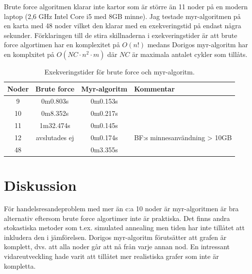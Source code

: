 \documentclass[11pt]{article}
\begin{document}
Brute force algoritmen klarar inte kartor som är större än 11 noder på en modern laptop (2,6 GHz Intel Core i5 med 8GB minne). Jag testade myr-algoritmen på en karta med 48 noder vilket den klarar med en exekveringstid på endast några sekunder. Förklaringen till de stira skillnaderna i exekveringstider är att brute force algortimen har en komplexitet på $O(n!)$ medans Dorigos myr-algoritm har en komplxitet på $O(NC \cdot n^2 \cdot m)$ där $NC$ är maximala antalet cykler som tillåts.

\begin{table}[h]
	\begin{center}
		\begin{tabular}{|c|c|c|l|}
			\hline  \bf Noder & \bf Brute force & \bf Myr-algoritm & \bf Kommentar \\  \hline
					9         & 0m0.803s        & 0m0.153s         & \\
					10        & 0m8.352s        & 0m0.217s         & \\
					11        & 1m32.474s       & 0m0.145s         & \\
					12        & avslutades ej   & 0m0.174s         & BF:s minnesanvändning > 10GB \\
					48        &                 & 0m3.355s         & \\
			\hline
		\end{tabular}
	\end{center}
	\caption{\label{table_exec_times} Exekveringstider för brute force och myr-algoritm. }
\end{table}

\section{Diskussion}

För handelsresandeproblem med mer än c:a 10 noder är myr-algoritmen är bra alternativ eftersom brute force algortimer inte är praktiska. Det finns andra stokastiska metoder som t.ex. simulated annealing men tiden har inte tillåtet att inkludera den i jämförelsen. Dorigos myr-algoritm förutsätter att grafen är komplett, dvs. att alla noder går att nå från varje annan nod. En intressant vidareutveckling hade varit att tillåtet mer realistiska grafer som inte är kompletta.
\end{document}
